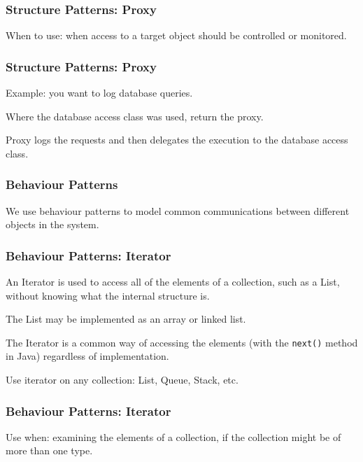 \begin{frame}
\frametitle{Structure Patterns: Proxy}
\begin{changemargin}{1cm}

When to use: when access to a target object should be controlled or monitored.

\end{changemargin}
\end{frame}

\begin{frame}
\frametitle{Structure Patterns: Proxy}
\begin{changemargin}{1cm}

Example: you want to log database queries. 

Where the database access class was used, return the proxy.

Proxy logs the requests and then delegates the execution to the database access class.

\end{changemargin}
\end{frame}

\begin{frame}
\frametitle{Behaviour Patterns}
\begin{changemargin}{1cm}
We use behaviour patterns to model common communications between different objects in the system.

\end{changemargin}
\end{frame}


\begin{frame}
\frametitle{Behaviour Patterns: Iterator}
\begin{changemargin}{1cm}
An Iterator is used to access all of the elements of a collection, such as a List, without knowing what the internal structure is.

The List may be implemented as an array or linked list. 

The Iterator is a common way of accessing the elements (with the \texttt{next()} method in Java) regardless of implementation.

Use iterator on any collection: List, Queue, Stack, etc.

\end{changemargin}
\end{frame}

\begin{frame}
\frametitle{Behaviour Patterns: Iterator}
\begin{changemargin}{1cm}
Use when: examining the elements of a collection, if the collection might be of more than one type.

\end{changemargin}
\end{frame}


